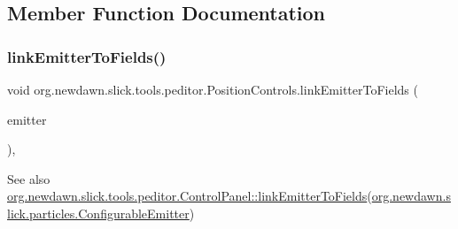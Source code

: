 \subsection{Member Function Documentation}
\mbox{\label{classorg_1_1newdawn_1_1slick_1_1tools_1_1peditor_1_1_position_controls_a682f1a5893312b3de3ceee398efd9ff6}} 
\subsubsection{\texorpdfstring{link\+Emitter\+To\+Fields()}{linkEmitterToFields()}}
{\footnotesize\ttfamily void org.\+newdawn.\+slick.\+tools.\+peditor.\+Position\+Controls.\+link\+Emitter\+To\+Fields (\begin{DoxyParamCaption}\item[{\mbox{\hyperlink{classorg_1_1newdawn_1_1slick_1_1particles_1_1_configurable_emitter}{Configurable\+Emitter}}}]{emitter }\end{DoxyParamCaption})\hspace{0.3cm}{\ttfamily [inline]}, {\ttfamily [protected]}}

\begin{DoxySeeAlso}{See also}
\mbox{\hyperlink{classorg_1_1newdawn_1_1slick_1_1tools_1_1peditor_1_1_control_panel_a55fa468548caadc265ea28c5f3214a20}{org.\+newdawn.\+slick.\+tools.\+peditor.\+Control\+Panel\+::link\+Emitter\+To\+Fields}}(\mbox{\hyperlink{classorg_1_1newdawn_1_1slick_1_1particles_1_1_configurable_emitter}{org.\+newdawn.\+slick.\+particles.\+Configurable\+Emitter}}) 
\end{DoxySeeAlso}

